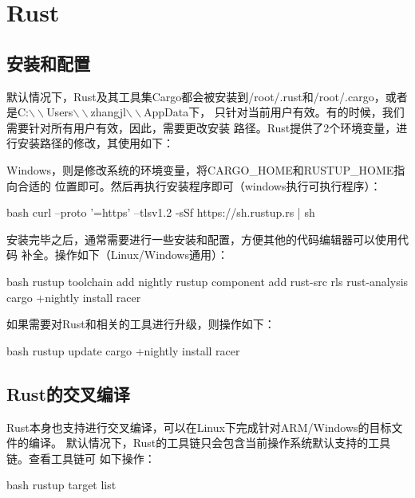\chapter{Rust}

\section{安装和配置}
默认情况下，Rust及其工具集Cargo都会被安装到/root/.rust和/root/.cargo，或者
是C:$\backslash\backslash$Users$\backslash\backslash$zhangjl$\backslash\backslash$AppData下，
只针对当前用户有效。有的时候，我们需要针对所有用户有效，因此，需要更改安装
路径。Rust提供了2个环境变量，进行安装路径的修改，其使用如下：

Windows，则是修改系统的环境变量，将CARGO\_HOME和RUSTUP\_HOME指向合适的
位置即可。然后再执行安装程序即可（windows执行可执行程序）：
\begin{code-block}{bash}
curl --proto '=https' --tlsv1.2 -sSf https://sh.rustup.rs | sh
\end{code-block}

安装完毕之后，通常需要进行一些安装和配置，方便其他的代码编辑器可以使用代码
补全。操作如下（Linux/Windows通用）：
\begin{code-block}{bash}
rustup toolchain add nightly
rustup component add rust-src rls rust-analysis
cargo +nightly install racer
\end{code-block}

如果需要对Rust和相关的工具进行升级，则操作如下：
\begin{code-block}{bash}
rustup update
cargo +nightly install racer
\end{code-block}

\section{Rust的交叉编译}
Rust本身也支持进行交叉编译，可以在Linux下完成针对ARM/Windows的目标文件的编译。
默认情况下，Rust的工具链只会包含当前操作系统默认支持的工具链。查看工具链可
如下操作：
\begin{code-block}{bash}
rustup target list
\end{code-block}


